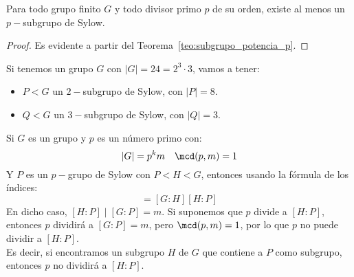 \begin{coro}
    Para todo grupo finito $G$ y todo divisor primo $p$ de su orden, existe al menos un $p-$subgrupo de Sylow.
    \begin{proof}
        Es evidente a partir del Teorema~\ref{teo:subgrupo_potencia_p}.
    \end{proof}
\end{coro}

\begin{ejemplo}
    Si tenemos un grupo $G$ con $|G| = 24 = 2^3 \cdot 3$, vamos a tener:
    \begin{itemize}
        \item $P<G$ un $2-$subgrupo de Sylow, con $|P| = 8$.
        \item $Q<G$ un $3-$subgrupo de Sylow, con $|Q| = 3$.
    \end{itemize}
\end{ejemplo}

\begin{observacion}
    Si $G$ es un grupo y $p$ es un número primo con:
    \begin{equation*}
        |G| = p^k m \quad \mcd(p,m) = 1
    \end{equation*}
    Y $P$ es un $p-$grupo de Sylow con $P<H<G$, entonces usando la fórmula de los índices:
    \begin{equation*}
        [G:P] = [G:H][H:P]
    \end{equation*}
    En dicho caso, $[H:P] \mid [G:P] = m$. Si suponemos que $p$ divide a $[H:P]$, entonces $p$ dividirá a $[G:P] = m$, pero $\mcd(p,m) = 1$, por lo que $p$ no puede dividir a $[H:P]$.\\

    \noindent
    Es decir, si encontramos un subgrupo $H$ de $G$ que contiene a $P$ como subgrupo, entonces $p$ no dividirá a $[H:P]$.
\end{observacion}~\\

